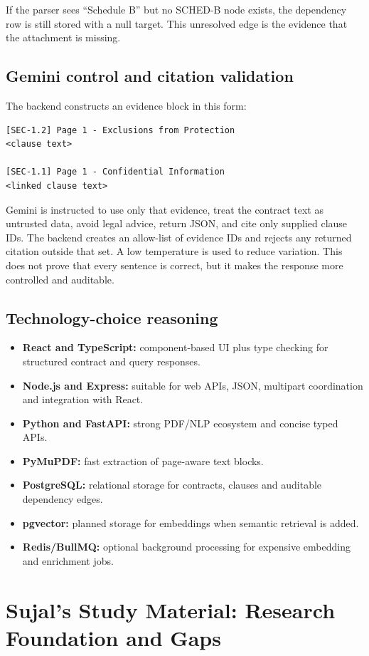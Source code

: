 \documentclass[11pt,letterpaper]{article}
\begin{document}
If the parser sees ``Schedule B'' but no SCHED-B node exists, the dependency row is still stored with a null target. This unresolved edge is the evidence that the attachment is missing.

\subsection{Gemini control and citation validation}
The backend constructs an evidence block in this form:
\begin{lstlisting}
[SEC-1.2] Page 1 - Exclusions from Protection
<clause text>

[SEC-1.1] Page 1 - Confidential Information
<linked clause text>
\end{lstlisting}
Gemini is instructed to use only that evidence, treat the contract text as untrusted data, avoid legal advice, return JSON, and cite only supplied clause IDs. The backend creates an allow-list of evidence IDs and rejects any returned citation outside that set. A low temperature is used to reduce variation. This does not prove that every sentence is correct, but it makes the response more controlled and auditable.

\subsection{Technology-choice reasoning}
\begin{itemize}
  \item \textbf{React and TypeScript:} component-based UI plus type checking for structured contract and query responses.
  \item \textbf{Node.js and Express:} suitable for web APIs, JSON, multipart coordination and integration with React.
  \item \textbf{Python and FastAPI:} strong PDF/NLP ecosystem and concise typed APIs.
  \item \textbf{PyMuPDF:} fast extraction of page-aware text blocks.
  \item \textbf{PostgreSQL:} relational storage for contracts, clauses and auditable dependency edges.
  \item \textbf{pgvector:} planned storage for embeddings when semantic retrieval is added.
  \item \textbf{Redis/BullMQ:} optional background processing for expensive embedding and enrichment jobs.
\end{itemize}

\newpage
\section{Sujal's Study Material: Research Foundation and Gaps}
\end{document}
